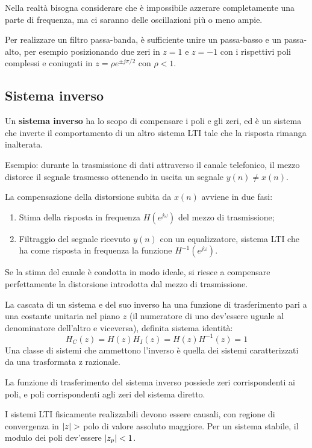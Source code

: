 Nella realtà bisogna considerare che è impossibile azzerare completamente una parte di frequenza, ma ci saranno delle oscillazioni più o meno ampie.

Per realizzare un filtro passa-banda, è sufficiente unire un passa-basso e un passa-alto, per esempio posizionando due zeri in $z = 1$ e $z = -1$ con i rispettivi poli complessi e coniugati in $z = \rho e^{\pm j\pi/2}$ con $\rho < 1$.

\subsection{Sistema inverso}
Un \textbf{sistema inverso} ha lo scopo di compensare i poli e gli zeri, ed è un sistema che inverte il comportamento di un altro sistema LTI tale che la risposta rimanga inalterata.

Esempio: durante la trasmissione di dati attraverso il canale telefonico, il mezzo distorce il segnale trasmesso ottenendo in uscita un segnale $y(n) \neq x(n)$.

La compensazione della distorsione subita da $x(n)$ avviene in due fasi:
\begin{enumerate}
	\item Stima della risposta in frequenza $H(e^{j\omega})$ del mezzo di trasmissione;
	\item Filtraggio del segnale ricevuto $y(n)$ con un equalizzatore, sistema LTI che ha come risposta in frequenza la funzione $H^{-1}(e^{j\omega})$.
\end{enumerate}

Se la stima del canale è condotta in modo ideale, si riesce a compensare perfettamente la distorsione introdotta dal mezzo di trasmissione.

La cascata di un sistema e del suo inverso ha una funzione di trasferimento pari a una costante unitaria nel piano $z$ (il numeratore di uno dev'essere uguale al denominatore dell'altro e viceversa), definita sistema identità:
$$H_C(z) = H(z)H_I(z) = H(z)H^{-1}(z) = 1$$
Una classe di sistemi che ammettono l'inverso è quella dei sistemi caratterizzati da una trasformata z razionale.

La funzione di trasferimento del sistema inverso possiede zeri corrispondenti ai poli, e poli corrispondenti agli zeri del sistema diretto.

I sistemi LTI fisicamente realizzabili devono essere causali, con regione di convergenza in $\left|z\right| >$ polo di valore assoluto maggiore. Per un sistema stabile, il modulo dei poli dev'essere $\left|z_p\right| < 1$.

